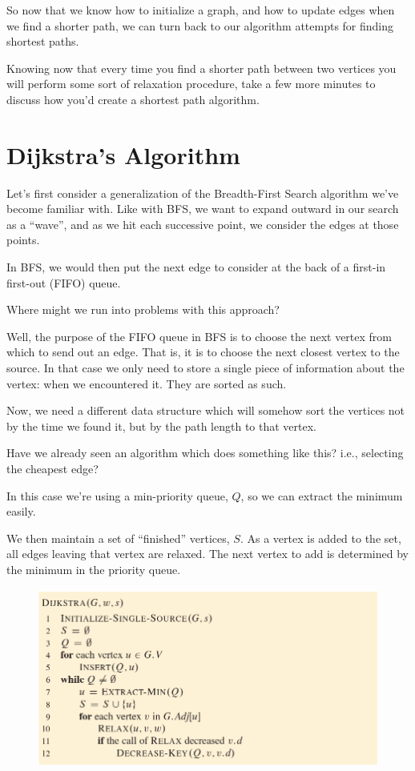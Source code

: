 \documentclass[]{article}
\begin{document}
So now that we know how to initialize a graph, and how to update edges when we find a shorter path, we can turn back to our algorithm attempts for finding shortest paths. 

Knowing now that every time you find a shorter path between two vertices you will perform some sort of relaxation procedure, take a few more minutes to discuss how you'd create a shortest path algorithm. 

\section*{Dijkstra's Algorithm}

Let's first consider a generalization of the Breadth-First Search algorithm we've become familiar with. Like with BFS, we want to expand outward in our search as a ``wave'', and as we hit each successive point, we consider the edges at those points. 

In BFS, we would then put the next edge to consider at the back of a first-in first-out (FIFO) queue.

Where might we run into problems with this approach? 

Well, the purpose of the FIFO queue in BFS is to choose the next vertex from which to send out an edge. That is, it is to choose the next closest vertex to the source. In that case we only need to store a single piece of information about the vertex: when we encountered it. They are sorted as such.

Now, we need a different data structure which will somehow sort the vertices not by the time we found it, but by the path length to that vertex. 

Have we already seen an algorithm which does something like this? i.e., selecting the cheapest edge? 

In this case we're using a min-priority queue, $Q$, so we can extract the minimum easily. 

We then maintain a set of ``finished'' vertices, $S$. As a vertex is added to the set, all edges leaving that vertex are relaxed. The next vertex to add is determined by the minimum in the priority queue. 


\begin{figure}[h]
    \includegraphics[width=\textwidth]{djikstra-pseudo.png}
\end{figure}
\end{document}
